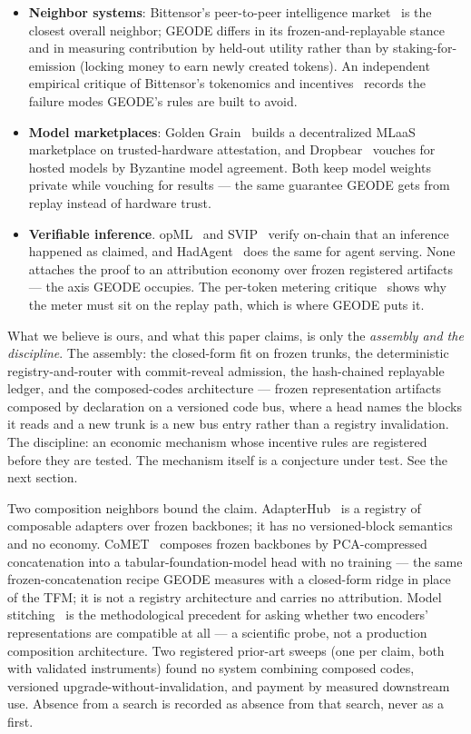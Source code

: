 \documentclass[11pt]{article}
\begin{document}
\begin{itemize}
precedent for the code space the registry is built around.
\item \textbf{Neighbor systems}: Bittensor's peer-to-peer
intelligence market~\cite{bittensor} is the closest overall
neighbor; GEODE differs in its frozen-and-replayable stance and in
measuring contribution by held-out utility rather than by
staking-for-emission (locking money to earn newly created tokens).
An independent empirical critique of Bittensor's tokenomics and
incentives~\cite{bittensor2025critique} records the failure modes
GEODE's rules are built to avoid.
\item \textbf{Model marketplaces}: Golden
Grain~\cite{goldengrain2020} builds a decentralized MLaaS
marketplace on trusted-hardware attestation, and
Dropbear~\cite{dropbear2022} vouches for hosted models by Byzantine
model agreement. Both keep model weights private while vouching for
results --- the same guarantee GEODE gets from replay instead of
hardware trust.
\item \textbf{Verifiable inference}. opML~\cite{opml2024} and
SVIP~\cite{svip2024} verify on-chain that an inference happened as
claimed, and HadAgent~\cite{hadagent2026} does the same for agent
serving. None attaches the proof to an attribution economy over
frozen registered artifacts --- the axis GEODE occupies. The
per-token metering critique~\cite{tokeninflation2026} shows why the
meter must sit on the replay path, which is where GEODE puts it.
\end{itemize}

What we believe is ours, and what this paper claims, is only the
\emph{assembly and the discipline}. The assembly: the closed-form
fit on frozen trunks, the deterministic registry-and-router with
commit-reveal admission, the hash-chained replayable ledger, and
the composed-codes architecture --- frozen representation artifacts
composed by declaration on a versioned code bus, where a head
names the blocks it reads and a new trunk is a new bus entry
rather than a registry invalidation. The discipline: an economic
mechanism whose incentive rules are registered before they are
tested. The mechanism itself is a conjecture under test. See the
next section.

Two composition neighbors bound the claim. AdapterHub~\cite%
{ruckle2020} is a registry of composable adapters over frozen
backbones; it has no versioned-block semantics and no economy.
CoMET~\cite{comet2026} composes frozen backbones by
PCA-compressed concatenation into a tabular-foundation-model head
with no training --- the same frozen-concatenation recipe GEODE
measures with a closed-form ridge in place of the TFM; it is not
a registry architecture and carries no attribution. Model
stitching~\cite{bansal2023} is the methodological precedent for
asking whether two encoders' representations are compatible at
all --- a scientific probe, not a production composition
architecture. Two registered prior-art sweeps (one per claim, both
with validated instruments) found no system combining composed
codes, versioned upgrade-without-invalidation, and payment by
measured downstream use. Absence from a search is recorded as
absence from that search, never as a first.
\end{document}
